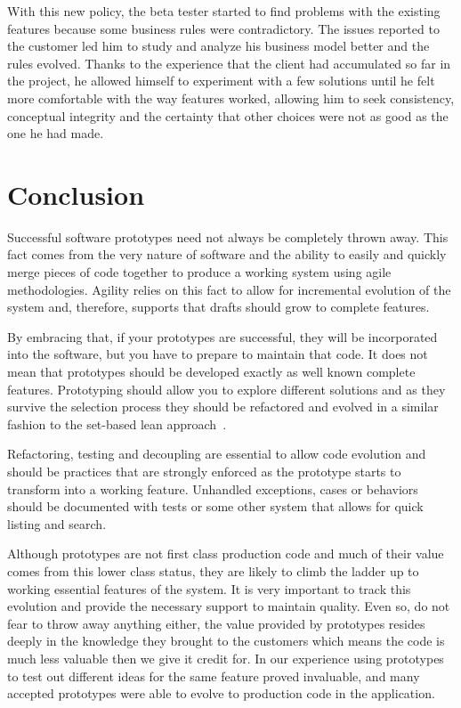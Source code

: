 \documentclass[lnbip]{svmultln}
\begin{document}
With this new policy, the beta tester started to find problems with
the existing features because some business rules were
contradictory. The issues reported to the customer led him to study
and analyze his business model better and the rules evolved. Thanks to
the experience that the client had accumulated so far in the project,
he allowed himself to experiment with a few solutions until he felt
more comfortable with the way features worked, allowing him to seek
consistency, conceptual integrity and the certainty that other choices
were not as good as the one he had made.

\section{Conclusion}
\label{sec:conclusion}

Successful software prototypes need not always be completely thrown
away. This fact comes from the very nature of software and the ability
to easily and quickly merge pieces of code together to produce a
working system using agile methodologies. Agility relies on this fact to allow for incremental
evolution of the system and, therefore, supports that drafts should
grow to complete features.

By embracing that, if your prototypes are successful, they will be
incorporated into the software, but you have to prepare to maintain that
code. It does not mean that prototypes should be developed exactly
as well known complete features. Prototyping should allow you to
explore different solutions and as they survive
the selection process they should be refactored and evolved in a similar fashion to the set-based lean approach~\cite{Poppendieck2009}.

Refactoring, testing and decoupling are essential to allow code
evolution and should be practices that are strongly enforced as the prototype 
starts to transform into a working feature. 
Unhandled exceptions, cases or behaviors should be
documented with tests or some other system that allows for
quick listing and search.

Although prototypes are not first class production code and much of
their value comes from this lower class status, they are likely to
climb the ladder up to working essential features of the system. It
is very important to track this evolution and provide the necessary support
to maintain quality. Even so, do not fear to throw away anything either,
the value provided by prototypes resides deeply in the knowledge they
brought to the customers which means the code is much less valuable
then we give it credit for. In our experience using prototypes to test out different ideas for the same feature proved invaluable, and many accepted prototypes were able to evolve to production code in the application.
\end{document}
